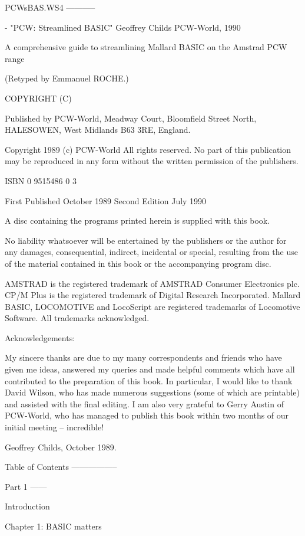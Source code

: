 

﻿PCWsBAS.WS4
-----------

- "PCW: Streamlined BASIC"
   Geoffrey Childs
   PCW-World, 1990

A comprehensive guide to streamlining Mallard BASIC on the Amstrad PCW range

(Retyped by Emmanuel ROCHE.)


COPYRIGHT (C)

Published  by  PCW-World, Meadway Court, Bloomfield Street  North,  HALESOWEN, 
West Midlands B63 3RE, England.

Copyright 1989 (c) PCW-World All rights reserved. No part of this  publication 
may  be  reproduced  in  any  form  without  the  written  permission  of  the 
publishers.

ISBN 0 9515486 0 3

First Published October 1989
Second Edition July 1990

A disc containing the programs printed herein is supplied with this book.

No  liability whatsoever will be entertained by the publishers or  the  author 
for  any  damages, consequential, indirect, incidental or  special,  resulting 
from  the  use  of the material contained in this  book  or  the  accompanying 
program disc.

AMSTRAD is the registered trademark of AMSTRAD Consumer Electronics plc.
CP/M Plus is the registered trademark of Digital Research Incorporated.
Mallard  BASIC,  LOCOMOTIVE  and  LocoScript  are  registered  trademarks   of 
Locomotive Software.
All trademarks acknowledged.


Acknowledgements:

My sincere thanks are due to my many correspondents and friends who have given 
me  ideas,  answered  my  queries and made helpful  comments  which  have  all 
contributed  to the preparation of this book. In particular, I would  like  to 
thank  David  Wilson,  who has made numerous suggestions (some  of  which  are 
printable)  and  assisted with the final editing. I am also very  grateful  to 
Gerry  Austin  of PCW-World, who has managed to publish this book  within  two 
months of our initial meeting -- incredible!

Geoffrey Childs, October 1989.


Table of Contents
-----------------

Part 1
------

Introduction

Chapter 1: BASIC matters

